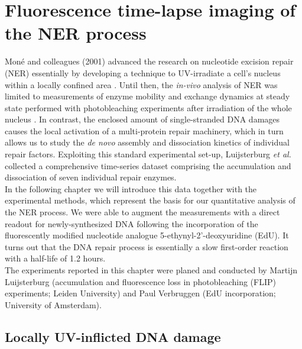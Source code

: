 \chapter{Fluorescence time-lapse imaging of the NER process}
\label{chap:quantData}
\pagestyle{plain}


Mon\'{e} and colleagues (2001) advanced the research on nucleotide excision repair (NER) essentially by developing a technique to UV-irradiate a cell's nucleus within a locally confined area \cite{Mone2001}. Until then, the \textit{in-vivo} analysis of NER was limited to measurements of enzyme mobility and exchange dynamics at steady state performed with photobleaching experiments after irradiation of the whole nucleus \cite{Houtsmuller2001,Mone2004,Vermeulen2011}. In contrast, the enclosed amount of single-stranded DNA damages causes the local activation of a multi-protein repair machinery, which in turn allows us to study the \textit{de novo} assembly and dissociation kinetics of individual repair factors. Exploiting this standard experimental set-up, Luijsterburg \textit{et al.}\ \cite{Luijsterburg2010} collected a comprehensive time-series dataset comprising the accumulation and dissociation of seven individual repair enzymes.\\ 
In the following chapter we will introduce this data together with the experimental methods, which represent the basis for our quantitative analysis of the NER process. We were able to augment the measurements with a direct readout for newly-synthesized DNA following the incorporation of the fluorescently modified nucleotide analogue 5-ethynyl-2'-deoxyuridine (EdU). It turns out that the DNA repair process is essentially a slow first-order reaction with a half-life of 1.2 hours.   \\


The experiments reported in this chapter were planed and conducted by Martijn Luijsterburg (accumulation and fluorescence loss in photobleaching (FLIP) experiments; Leiden University) and Paul Verbruggen (EdU incorporation; University of Amsterdam).
	
	


\section{Locally UV-inflicted DNA damage}
\label{sec:local_irradiation}
 

